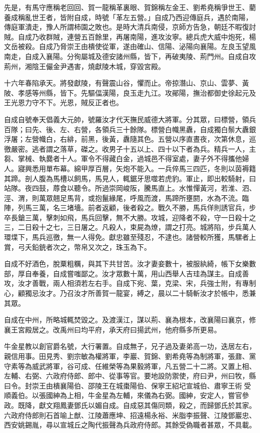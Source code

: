 \begin{pinyinscope}
先是，有馬守應稱老回回、賀一龍稱革裏眼、賀錦稱左金王、劉希堯稱爭世王、藺養成稱亂世王者，皆附自成，時號「革左五營。」自成乃西迎傳庭兵，遇於南陽，傳庭軍潰走，豫人所謂柿園之敗也。是時大清兵南侵，京師方告急，朝廷不暇復討賊。自成乃收群賊，連營五百餘里，再屠南陽，進攻汝寧。總兵虎大威中炮死，楊文岳被殺。自成乃脅崇王由樻使從軍，遂由確山、信陽、泌陽向襄陽。左良玉望風南走，自成入襄陽。分徇屬城及德安諸州縣，皆下，再破夷陵、荊門州。自成自攻荊州，湘陰王儼金尹遇害，燒獻陵木城，穿毀宮殿。

十六年春陷承天。將發獻陵，有聲震山谷，懼而止。帝掠潛山、京山、雲夢、黃陂、孝感等州縣，皆下。先驅偪漢陽，良玉走九江。攻鄖陽，撫治都御史徐起元及王光恩力守不下。光恩，賊反正者也。

自成自號奉天倡義大元帥，號羅汝才代天撫民威德大將軍。分其眾，曰標營，領兵百隊；曰先、後、左、右營，各領兵三十餘隊。標營白幟黑纛，自成獨白鬃大纛銀浮屠；左營幟白，右緋，前黑，後黃，纛隨其色。五營以序直晝夜，次第休息，巡徼嚴密。逃者謂之落草，磔之。收男子十五以上、四十以下者為兵。精兵一人，主芻、掌械、執爨者十人。軍令不得藏白金，過城邑不得室處，妻子外不得攜他婦人。寢興悉用單布幕。綿甲厚百層，矢炮不能入。一兵倅馬三四匹，冬則以茵褥籍其蹄。剖人腹為馬槽以飼馬，馬見人，輒鋸牙思噬若虎豹。軍止，即出較騎射，曰站隊。夜四鼓，蓐食以聽令。所過崇岡峻阪，騰馬直上。水惟憚黃河，若淮、泗、涇、渭，則萬眾翹足馬背，或抱鬣緣尾，呼風而渡，馬蹄所壅閼，水為不流。臨陣，列馬三萬，名三堵墻。前者返顧，後者殺之。戰久不勝，馬兵佯則誘官兵，步卒長鎗三萬，擊刺如飛，馬兵回擊，無不大勝。攻城，迎降者不殺，守一日殺十之三，二日殺十之七，三日屠之。凡殺人，束屍為燎，謂之打亮。城將陷，步兵萬人環堞下，馬兵巡徼，無一人得免。獻忠雖至殘忍，不逮也。諸營較所獲，馬騾者上賞，弓夭鉛銃者次之，幣帛又次之，珠玉為下。

自成不好酒色，脫粟粗糲，與其下共甘苦。汝才妻妾數十，被服紈綺，帳下女樂數部，厚自奉養，自成嘗嗤鄙之。汝才眾數十萬，用山西舉人吉珪為謀主。自成善攻，汝才善戰，兩人相須若左右手。自成下宛、葉，克梁、宋，兵強士附，有專制心，顧獨忌汝才。乃召汝才所善賀一龍宴，縛之，晨以二十騎斬汝才於帳中，悉兼其眾。

自成在中州，所略城輒焚毀之。及渡漢江，謀以荊、襄為根本，改襄陽曰襄京，修襄王宮殿居之。改禹州曰均平府，承天府曰揚武州，他府縣多所更易。

牛金星教以創官爵名號，大行署置。自成無子，兄子過及妻弟高一功，迭居左右，親信用事。田見秀、劉宗敏為權將軍，李巖、賀錦、劉希堯等為制將軍，張鼐、黨守素等為威武將軍，谷可成、任維榮等為果毅將軍，凡五營二十二將。又置上相、左輔、右弼、六政府侍郎、郎中、從事等官。要地設防禦使，府曰尹，州曰牧，縣曰令。封崇王由樻襄陽伯、邵陵王在城棗陽伯、保寧王紹圮宣城伯、肅寧王術受順義伯。以張國紳為上相，牛金星為左輔，來儀為右弼。國紳，安定人，嘗官參政。既降，獻文翔鳳妻鄧氏以媚自成。自成惡其傷同類，殺之，而歸鄧氏於其家。六政府侍郎則石首喻上猷、江陵蕭應坤、招遠楊永裕、米脂李振聲、江陵鄧巖忠、西安姚錫胤，尋以宣城丘之陶代振聲為兵政府侍郎。其餘受偽職者甚眾，不具載。


\end{pinyinscope}
